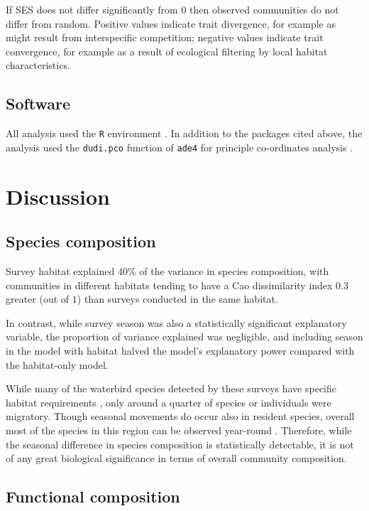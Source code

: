 \documentclass[12pt,a4paper]{book}
\begin{document}
If SES does not differ significantly from $0$ then observed communities do not differ from random. Positive values indicate trait divergence, for example as might result from interspecific competition; negative values indicate trait convergence, for example as a result of ecological filtering by local habitat characteristics.

\subsection{Software}

All analysis used the \texttt{R} environment \citep{R2016}. In addition to the packages cited above, the analysis used the \texttt{dudi.pco} function of \texttt{ade4} for principle co-ordinates analysis \citep{Dray2007}. 

%
%

\clearpage
\section{Discussion}

\subsection{Species composition}

Survey habitat explained $40$\% of the variance in species composition, with communities in different habitats tending to have a Cao dissimilarity index $0.3$ greater (out of $1$) than surveys conducted in the same habitat.

In contrast, while survey season was also a statistically significant explanatory variable, the proportion of variance explained was negligible, and including season in the model with habitat halved the model's explanatory power compared with the habitat-only model. 

While many of the waterbird species detected by these surveys have specific habitat requirements \citep{DelHoyo2016}, only around a quarter of species or individuals were migratory. Though seasonal movements do occur also in resident species, overall most of the species in this region can be observed year-round \citep{Nascimento1995}. Therefore, while the seasonal difference in species composition is statistically detectable, it is not of any great biological significance in terms of overall community composition.

\subsection{Functional composition}
\end{document}

